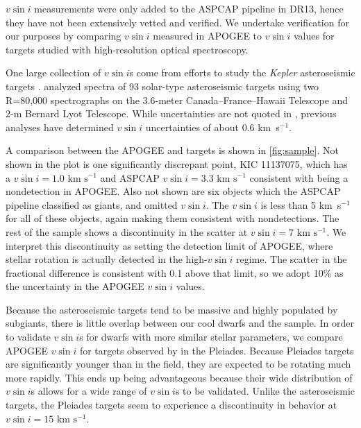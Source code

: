 \documentclass[manuscript]{aastex6}
\newcommand{\vsini}{\ensuremath{v \sin i}}
\newcommand{\Kepler}{\mbox{\textit{Kepler}}}
\newcommand{\kms}{\textrm{ km~s}\ensuremath{^{-1}}}
\newcommand{\gvs}{\authorcomment1}
\begin{document}
\vsini{} measurements were only added to the ASPCAP pipeline in DR13, hence
they have not been extensively vetted and verified. We undertake 
verification for our purposes by comparing \vsini{} measured in APOGEE to \vsini{} values for
targets studied with high-resolution optical spectroscopy. 

One large collection of \vsini{}s come from efforts to study the
\Kepler{} asteroseismic targets \citep{Bruntt12}. \citet{Bruntt12} analyzed 
spectra of 93 solar-type asteroseismic targets using two R=80,000 spectrographs 
on the 3.6-meter Canada--France--Hawaii Telescope and 2-m Bernard Lyot
Telescope. While uncertainties are not quoted in \citet{Bruntt12},
previous analyses have determined \vsini{} uncertainties of about 0.6
\kms \citep{Bruntt10a,Bruntt10b}.

A comparison between the APOGEE and \citet{Bruntt12} targets is shown in
\cref{fig:sample}. Not shown in the plot is one significantly discrepant point, 
KIC 11137075, which has a \citet{Bruntt12}
\(\vsini = 1.0 \kms\) and ASPCAP \(\vsini = 3.3 \kms\) consistent with being a
nondetection in APOGEE. Also not shown are six
objects which the ASPCAP pipeline classified as giants, and omitted
\vsini{}. The \citet{Bruntt12} \vsini{} is less than 5
\kms{} for all of these objects, again making them consistent with nondetections.
The rest of the sample shows a discontinuity in the scatter at \citet{Bruntt12} 
\(\vsini=7\kms\). We interpret this discontinuity as setting the detection limit 
of APOGEE, where stellar rotation is actually detected in the high-\vsini{} 
regime.  The scatter in the fractional difference is consistent with 0.1 above that
limit, so we adopt 10\% as the uncertainty in the APOGEE \vsini{} values.

Because the asteroseismic targets tend to be massive and highly populated by
subgiants, there is little overlap between our cool dwarfs and the 
\citet{Bruntt12} sample. In order to validate \vsini{}s for dwarfs with more
similar stellar parameters, we compare
APOGEE \vsini{} for targets observed by \citet{Stauffer87} in the
Pleiades. Because Pleiades targets are significantly younger than in the field,
they are expected to be rotating much more rapidly. This ends up being
advantageous because their wide
distribution of \vsini{}s allows for a wide range of \vsini{}s to be validated. 
Unlike the asteroseismic targets, the Pleiades targets seem to experience a
discontinuity in behavior at \(\vsini = 15 \kms\). \gvs{Check that scatter above
is consistent with 10\%}
\end{document}
